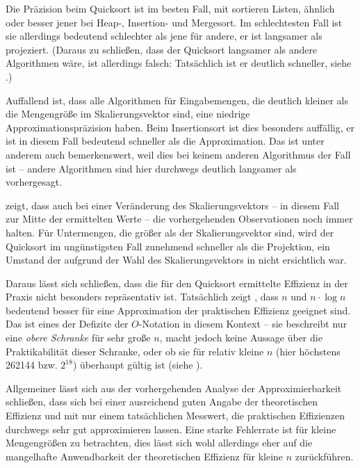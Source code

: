 Die Präzision beim Quicksort ist im besten Fall, mit sortieren Listen, ähnlich oder besser jener bei Heap-, Insertion- und Mergesort. Im schlechtesten Fall ist sie allerdings bedeutend schlechter als jene für andere, er ist langsamer als projeziert. (Daraus zu schließen, dass der Quicksort langsamer als andere Algorithmen wäre, ist allerdings falsch: Tatsächlich ist er deutlich schneller, siehe .)

Auffallend ist, dass alle Algorithmen für Eingabemengen, die deutlich kleiner als die Mengengröße im Skalierungsvektor sind, eine niedrige Approximationspräzision haben. Beim Insertionsort ist dies besonders auffällig, er ist in diesem Fall bedeutend schneller als die Approximation. Das ist unter anderem auch bemerkenswert, weil dies bei keinem anderen Algorithmus der Fall ist -- andere Algorithmen sind hier durchwegs deutlich langsamer als vorhergesagt.



 zeigt, dass auch bei einer Veränderung des Skalierungsvektors -- in diesem Fall zur Mitte der ermittelten Werte -- die vorhergehenden Observationen noch immer halten. Für Untermengen, die größer als der Skalierungsvektor sind, wird der Quicksort im ungünstigsten Fall zunehmend schneller als die Projektion, ein Umstand der aufgrund der Wahl des Skalierungsvektors in  nicht ersichtlich war.

Daraus lässt sich schließen, dass die für den Quicksort ermittelte Effizienz in der Praxis nicht besonders repräsentativ ist. Tatsächlich zeigt , dass $n$ und $n \cdot \log{n}$ bedeutend besser für eine Approximation der praktischen Effizienz geeignet sind. Das ist eines der Defizite der $O$-Notation in diesem Kontext -- sie beschreibt nur eine \emph{obere Schranke} für sehr große $n$, macht jedoch keine Aussage über die Praktikabilität dieser Schranke, oder ob sie für relativ kleine $n$ (hier höchstens 262144 bzw. $2^{18}$) überhaupt gültig ist (siehe ).



Allgemeiner lässt sich aus der vorhergehenden Analyse der Approximierbarkeit schließen, dass sich bei einer ausreichend guten Angabe der theoretischen Effizienz und mit nur einem tatsächlichen Messwert, die praktischen Effizienzen durchwegs sehr gut approximieren lassen. Eine starke Fehlerrate ist für kleine Mengengrößen zu betrachten, dies lässt sich wohl allerdings eher auf die mangelhafte Anwendbarkeit der theoretischen Effizienz für kleine $n$ zurückführen.

